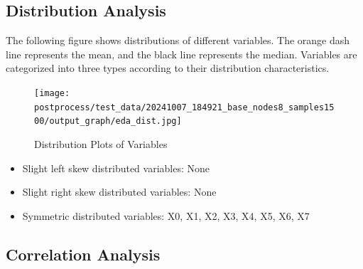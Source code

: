 \documentclass{article}
\begin{document}
\subsection{Distribution Analysis}
The following figure shows distributions of different variables. The orange dash line represents the mean, 
and the black line represents the median. Variables are categorized into three types according to their distribution characteristics.

\begin{figure}[H]
\centering
\texttt{[image: postprocess/test\_data/20241007\_184921\_base\_nodes8\_samples1500/output\_graph/eda\_dist.jpg]}
\caption{\label{fig:dist}Distribution Plots of Variables}
\end{figure}

\begin{itemize}
\item Slight left skew distributed variables: None
\item Slight right skew distributed variables: None
\item Symmetric distributed variables: X0, X1, X2, X3, X4, X5, X6, X7
\end{itemize}

\subsection{Correlation Analysis}
\end{document}
